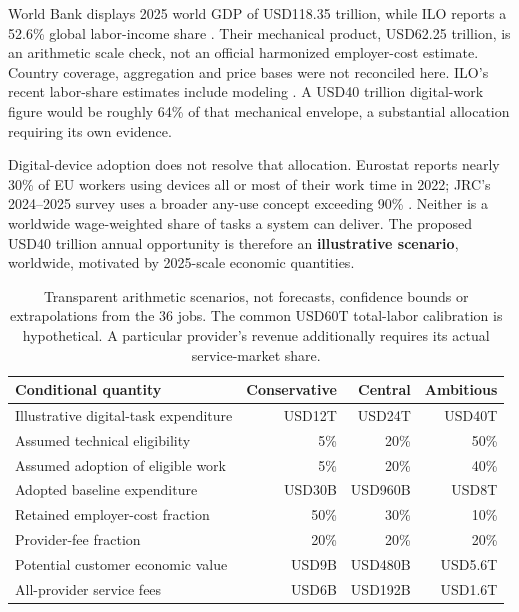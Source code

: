 \documentclass[11pt,a4paper]{article}
\newcommand{\smalltable}{\small\setlength{\tabcolsep}{5pt}}
\begin{document}
World Bank displays 2025 world GDP of USD118.35 trillion, while ILO reports a 52.6\% global labor-income share \citep{worldbank2025gdp,ilo2026sdgreview}. Their mechanical product, USD62.25 trillion, is an arithmetic scale check, not an official harmonized employer-cost estimate. Country coverage, aggregation and price bases were not reconciled here. ILO's recent labor-share estimates include modeling \citep{ilo2026modelmethods}. A USD40 trillion digital-work figure would be roughly 64\% of that mechanical envelope, a substantial allocation requiring its own evidence.

Digital-device adoption does not resolve that allocation. Eurostat reports nearly 30\% of EU workers using devices all or most of their work time in 2022; JRC's 2024--2025 survey uses a broader any-use concept exceeding 90\% \citep{eurostat2022digital,jrc2025digital}. Neither is a worldwide wage-weighted share of tasks a system can deliver. The proposed USD40 trillion annual opportunity is therefore an \textbf{illustrative scenario}, worldwide, motivated by 2025-scale economic quantities.

\begin{table}[H]\centering\smalltable
\begin{tabularx}{\linewidth}{Yrrr}
\toprule
Conditional quantity & Conservative & Central & Ambitious\\
\midrule
Illustrative digital-task expenditure & USD12T & USD24T & USD40T\\
Assumed technical eligibility & 5\% & 20\% & 50\%\\
Assumed adoption of eligible work & 5\% & 20\% & 40\%\\
Adopted baseline expenditure & USD30B & USD960B & USD8T\\
Retained employer-cost fraction & 50\% & 30\% & 10\%\\
Provider-fee fraction & 20\% & 20\% & 20\%\\
Potential customer economic value & USD9B & USD480B & USD5.6T\\
All-provider service fees & USD6B & USD192B & USD1.6T\\
\bottomrule
\end{tabularx}
\caption{Transparent arithmetic scenarios, not forecasts, confidence bounds or extrapolations from the 36 jobs. The common USD60T total-labor calibration is hypothetical. A particular provider's revenue additionally requires its actual service-market share.}
\end{table}
\end{document}
